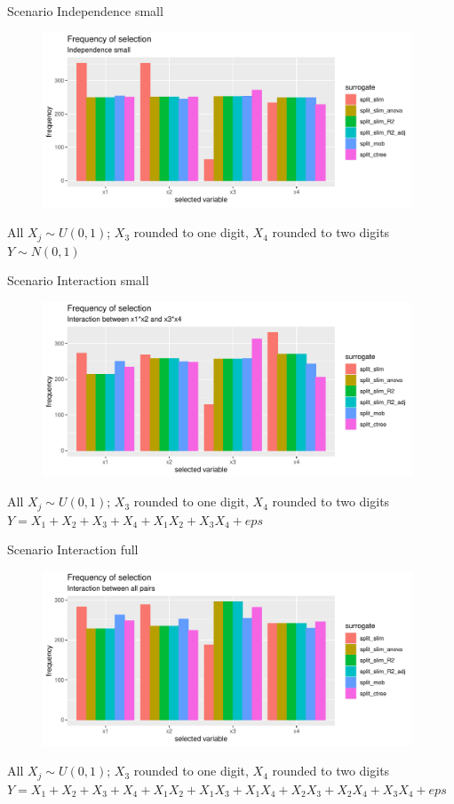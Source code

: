 \documentclass[9pt, xcolor=table]{beamer}
\begin{document}
\begin{frame}{Scenario Independence small}
\begin{figure}
    \includegraphics[width=11cm]{Figures/Selection_Bias/independence_small_frequency.pdf}
\end{figure}
All $X_j \sim U(0,1)$; $X_3$ rounded to one digit, $X_4$ rounded to two digits\\
$Y \sim N(0,1)$
\end{frame}

\begin{frame}{Scenario Interaction small}
\begin{figure}
    \includegraphics[width=11cm]{Figures/Selection_Bias/interaction_frequency.pdf}
\end{figure}
All $X_j \sim U(0,1)$; $X_3$ rounded to one digit, $X_4$ rounded to two digits\\
$Y = X_1 + X_2 + X_3 + X_4 + X_1 X_2 + X_3 X_4 + eps$
\end{frame}

\begin{frame}{Scenario Interaction full}
\begin{figure}
    \includegraphics[width=11cm]{Figures/Selection_Bias/interaction_full_frequency.pdf}
\end{figure}
All $X_j \sim U(0,1)$; $X_3$ rounded to one digit, $X_4$ rounded to two digits\\
$Y = X_1 + X_2 + X_3 + X_4 + X_1 X_2 + X_1 X_3 + X_1 X_4 + X_2 X_3 + X_2 X_4 + X_3 X_4 + eps$
\end{frame}
\end{document}
